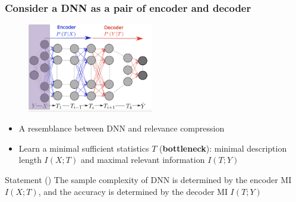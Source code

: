 \documentclass[notes]{beamer}
\begin{document}
\begin{frame}
    \frametitle{Consider a DNN as a pair of encoder and decoder}
    \begin{figure}
        \centering
        \includegraphics[width=5.5cm]{IB_encoder_decoder.jpg}
    \end{figure}
    \vspace{-0.2cm}
    \begin{itemize}
        \item A resemblance between DNN and relevance compression
        \item Learn a minimal sufficient statistics $T$ (\textbf{bottleneck}): minimal description length $I(X;T)$ and maximal relevant information $I(T;Y)$
    \end{itemize}
    \vspace{-0.2cm}
    \begin{block}{Statement (\cite{IB-DNN})}
        The sample complexity of DNN is determined by the encoder MI $I(X;T)$, and the accuracy is determined by the decoder MI $I(T;Y)$
    \end{block}
\end{frame}
\end{document}
